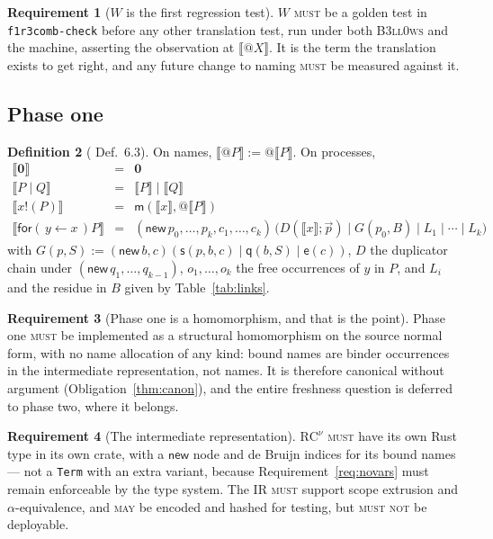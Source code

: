 \documentclass[11pt,a4paper]{article}
\makeatletter
\newcommand{\code}[1]{\texttt{#1}}
\newcommand{\Bell}{\textsc{B3ll0ws}}
\newcommand{\MUST}{\textsc{must}}
\newcommand{\MUSTNOT}{\textsc{must not}}
\newcommand{\MAY}{\textsc{may}}
\newcommand{\quo}[1]{@#1}
\newcommand{\inp}[3]{\mathsf{for}(\,#1 \leftarrow #2\,)#3}
\newcommand{\out}[2]{#1!(#2)}
\newcommand{\nil}{\mathbf{0}}
\newcommand{\enc}[1]{\llbracket #1 \rrbracket}
\newcommand{\mm}{\mathsf{m}}
\newcommand{\sy}{\mathsf{s}}
\newcommand{\ev}{\mathsf{e}}
\newcommand{\qq}{\mathsf{q}}
\theoremstyle{definition}
\newtheorem{definition}{Definition}[section]
\newtheorem{requirement}[definition]{Requirement}
\theoremstyle{plain}
\makeatother
\begin{document}
\begin{requirement}[$W$ is the first regression test]\label{req:Wtest}
$W$ \MUST{} be a golden test in \code{f1r3comb-check} before any other
translation test, run under both \Bell{} and the machine, asserting the
observation at $\enc{\quo{X}}$. It is the term the translation exists to get
right, and any future change to naming \MUST{} be measured against it.
\end{requirement}

\subsection{Phase one}\label{sec:ir}

\begin{definition}[\cite{draft3} Def.~6.3]\label{def:phase1}
On names, $\enc{\quo{P}} := \quo{\enc{P}}$. On processes,
\[
\begin{array}{rcl}
  \enc{\nil} &=& \nil\\
  \enc{P \mid Q} &=& \enc{P} \mid \enc{Q}\\
  \enc{\out{x}{P}} &=& \mm(\enc{x}, \quo{\enc{P}})\\
  \enc{\inp{y}{x}{P}} &=& (\mathsf{new}\,p_{0},\dots,p_{k},c_{1},\dots,c_{k})\,
    \big(D(\enc{x};\vec p) \mid G(p_{0}, B) \mid L_{1} \mid \cdots \mid L_{k}\big)
\end{array}
\]
with $G(p,S) := (\mathsf{new}\,b,c)(\sy(p,b,c) \mid \qq(b,S) \mid \ev(c))$,
$D$ the duplicator chain under $(\mathsf{new}\,q_{1},\dots,q_{k-1})$,
$o_{1},\dots,o_{k}$ the free occurrences of $y$ in $P$, and $L_{i}$ and the
residue in $B$ given by Table~\ref{tab:links}.
\end{definition}

\begin{requirement}[Phase one is a homomorphism, and that is the point]
\label{req:phase1hom}
Phase one \MUST{} be implemented as a structural homomorphism on the source
normal form, with no name allocation of any kind: bound names are binder
occurrences in the intermediate representation, not names. It is therefore
canonical without argument (Obligation~\ref{thm:canon}), and the entire
freshness question is deferred to phase two, where it belongs.
\end{requirement}

\begin{requirement}[The intermediate representation]\label{req:irtype}
$\mathrm{RC}^{\nu}$ \MUST{} have its own Rust type in its own crate, with a
$\mathsf{new}$ node and de Bruijn indices for its bound names --- not a
\code{Term} with an extra variant, because
Requirement~\ref{req:novars} must remain enforceable by the type system. The
IR \MUST{} support scope extrusion and $\alpha$-equivalence, and \MAY{} be
encoded and hashed for testing, but \MUSTNOT{} be deployable.
\end{requirement}
\end{document}
